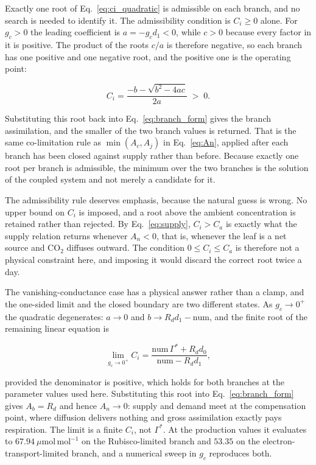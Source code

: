 Exactly one root of Eq.~\eqref{eq:ci_quadratic} is admissible on each branch, and
no search is needed to identify it. The admissibility condition is $C_i \geq 0$
alone. For $g_c > 0$ the leading coefficient is $a = -g_c d_1 < 0$, while $c > 0$
because every factor in it is positive. The product of the roots $c/a$ is
therefore negative, so each branch has one positive and one negative root, and the
positive one is the operating point:

\begin{equation}
C_i =
\frac{-b - \sqrt{b^{2} - 4ac}}{2a}
\;>\; 0 .
\label{eq:ci_root}
\end{equation}

Substituting this root back into Eq.~\eqref{eq:branch_form} gives the branch
assimilation, and the smaller of the two branch values is returned. That is the
same co-limitation rule as $\min(A_c,A_j)$ in Eq.~\eqref{eq:An}, applied after
each branch has been closed against supply rather than before. Because exactly one
root per branch is admissible, the minimum over the two branches is the solution
of the coupled system and not merely a candidate for it.

The admissibility rule deserves emphasis, because the natural guess is wrong. No
upper bound on $C_i$ is imposed, and a root above the ambient concentration is
retained rather than rejected. By Eq.~\eqref{eq:supply}, $C_i > C_a$ is exactly
what the supply relation returns whenever $A_n < 0$, that is, whenever the leaf is
a net source and CO$_2$ diffuses outward. The condition $0 \le C_i \le C_a$ is
therefore not a physical constraint here, and imposing it would discard the
correct root twice a day.

The vanishing-conductance case has a physical answer rather than a clamp, and the
one-sided limit and the closed boundary are two different states. As
$g_c \to 0^{+}$ the quadratic degenerates: $a \to 0$ and
$b \to R_d d_1 - \mathrm{num}$, and the finite root of the remaining linear
equation is

\begin{equation}
\lim_{g_c \to 0^{+}} C_i
= \frac{\mathrm{num}\,\Gamma^{*} + R_d d_0}{\mathrm{num} - R_d d_1},
\label{eq:ci_limit}
\end{equation}

provided the denominator is positive, which holds for both branches at the
parameter values used here. Substituting this root into
Eq.~\eqref{eq:branch_form} gives $A_b = R_d$ and hence $A_n \to 0$: supply and
demand meet at the compensation point, where diffusion delivers nothing and
gross assimilation exactly pays respiration. The limit is a finite
$C_i$, not $\Gamma^{*}$. At the production values it evaluates to
$67.94~\mu\mathrm{mol\,mol^{-1}}$ on the Rubisco-limited branch and
$53.35$ on the electron-transport-limited branch, and a numerical sweep in
$g_c$ reproduces both.

